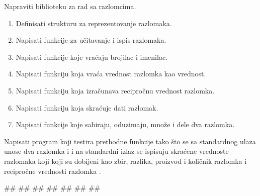 \begin{Exercise}[label=004] %
Napraviti biblioteku za rad sa razlomcima.

  \begin{enumerate}

  \item Definisati strukturu za reprezentovanje razlomaka.

  \item Napisati funkcije za učitavanje i ispis razlomaka.

  \item Napisati funkcije koje vraćaju brojilac i imenilac.

  \item Napisati funkciju koja vraća vrednost razlomka kao  
    vrednost.

  \item Napisati funkciju koja izračunava recipročnu vrednost
    razlomka.

  \item Napisati funkciju koja skraćuje dati razlomak.

  \item Napisati funkcije koje sabiraju, oduzimaju, množe i dele
    dva razlomka.

  \end{enumerate}

Napisati program koji testira prethodne funkcije tako što se sa standardnog ulaza unose dva razlomka  i  i na standardni izlaz se ispisuju skraćene vrednoste razlomaka koji koji su dobijeni kao zbir, razlika, proizvod i količnik razlomka  i recipročne vrednosti razlomka .


\begin{maxitest}
\begin{upotreba}{1}

#\naslovInt#
##
##
##
##
##
##
\end{upotreba}
\end{maxitest}



\end{Exercise}

